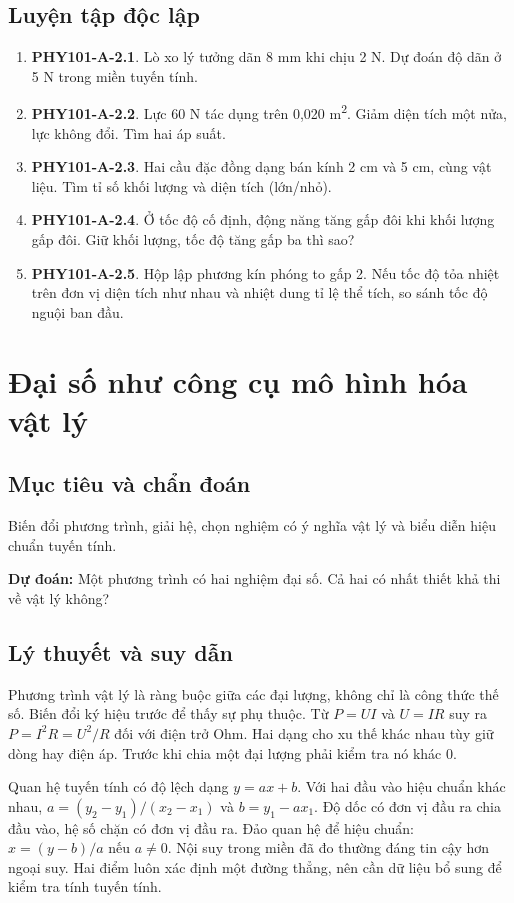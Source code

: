 \documentclass[11pt,a4paper,openany]{book}
\begin{document}
\section{Luyện tập độc lập}
\begin{enumerate}
\item \textbf{PHY101-A-2.1}. Lò xo lý tưởng dãn 8 mm khi chịu 2 N. Dự đoán độ dãn ở 5 N trong miền tuyến tính.
\item \textbf{PHY101-A-2.2}. Lực 60 N tác dụng trên 0,020 m\textsuperscript{2}. Giảm diện tích một nửa, lực không đổi. Tìm hai áp suất.
\item \textbf{PHY101-A-2.3}. Hai cầu đặc đồng dạng bán kính 2 cm và 5 cm, cùng vật liệu. Tìm tỉ số khối lượng và diện tích (lớn/nhỏ).
\item \textbf{PHY101-A-2.4}. Ở tốc độ cố định, động năng tăng gấp đôi khi khối lượng gấp đôi. Giữ khối lượng, tốc độ tăng gấp ba thì sao?
\item \textbf{PHY101-A-2.5}. Hộp lập phương kín phóng to gấp 2. Nếu tốc độ tỏa nhiệt trên đơn vị diện tích như nhau và nhiệt dung tỉ lệ thể tích, so sánh tốc độ nguội ban đầu.
\end{enumerate}
\chapter{Đại số như công cụ mô hình hóa vật lý}
\section{Mục tiêu và chẩn đoán}
Biến đổi phương trình, giải hệ, chọn nghiệm có ý nghĩa vật lý và biểu diễn hiệu chuẩn tuyến tính.

\textbf{Dự đoán:} Một phương trình có hai nghiệm đại số. Cả hai có nhất thiết khả thi về vật lý không?
\section{Lý thuyết và suy dẫn}
Phương trình vật lý là ràng buộc giữa các đại lượng, không chỉ là công thức thế số. Biến đổi ký hiệu trước để thấy sự phụ thuộc. Từ $P=UI$ và $U=IR$ suy ra $P=I^2R=U^2/R$ đối với điện trở Ohm. Hai dạng cho xu thế khác nhau tùy giữ dòng hay điện áp. Trước khi chia một đại lượng phải kiểm tra nó khác 0.

Quan hệ tuyến tính có độ lệch dạng $y=ax+b$. Với hai đầu vào hiệu chuẩn khác nhau, $a=(y_2-y_1)/(x_2-x_1)$ và $b=y_1-ax_1$. Độ dốc có đơn vị đầu ra chia đầu vào, hệ số chặn có đơn vị đầu ra. Đảo quan hệ để hiệu chuẩn: $x=(y-b)/a$ nếu $a\ne0$. Nội suy trong miền đã đo thường đáng tin cậy hơn ngoại suy. Hai điểm luôn xác định một đường thẳng, nên cần dữ liệu bổ sung để kiểm tra tính tuyến tính.
\end{document}
